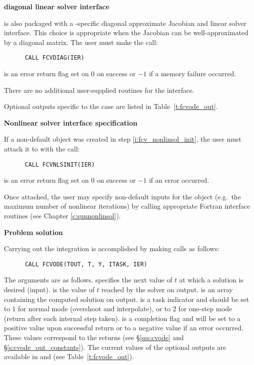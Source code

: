 \begin{Steps}
  {\bf {\cvdiag} diagonal linear solver interface}
  
  {\cvode} is also packaged with a {\cvode}-specific diagonal
  approximate Jacobian and linear solver interface.  This choice is
  appropriate when the Jacobian can be well-approximated by a diagonal
  matrix.  The user must make the call: 
\begin{verbatim}
      CALL FCVDIAG(IER)
\end{verbatim}
   is an error return flag set on $0$ on success or $-1$ if a memory 
  failure occurred.

  There are no additional user-supplied routines for the {\cvdiag} interface.
  
  Optional outputs specific to the {\cvdiag} case are listed in
  Table~\ref{t:fcvode_out}.
  
\item\label{i:fcvode_nonlin_solv_spec} {\bf Nonlinear solver interface specification} 
 
  If a non-default {\sunnonlinsol} object was created in step
  \ref{i:fcv_nonlinsol_init}, the user must attach it to {\cvode} with
  the call:
\begin{verbatim}
      CALL FCVNLSINIT(IER)
\end{verbatim}
   is an error return flag set on $0$ on success or $-1$ if an
  error occurred.

  Once attached, the user may specify non-default inputs for the
  {\sunnonlinsol} object (e.g.~the maximum number of nonlinear
  iterations) by calling appropriate Fortran interface routines (see Chapter
  \ref{c:sunnonlinsol}). 

\item {\bf Problem solution}

  Carrying out the integration is accomplished by making calls as follows:
\begin{verbatim}
      CALL FCVODE(TOUT, T, Y, ITASK, IER)
\end{verbatim}
  The arguments are as follows.
   specifies the next value of $t$ at which a solution is desired (input).
   is the value of $t$ reached by the solver on output.
   is an array containing the computed solution on output.
   is a task indicator and should be set to $1$ for normal mode 
  (overshoot  and interpolate), or to $2$ for one-step mode 
  (return after each internal step taken).
   is a completion flag and will be set to a positive value upon
  successful return or to a negative value if an error occurred. These values
  correspond to the  returns (see \S\ref{sss:cvode} and \S\ref{s:cvode_out_constants}).
  The current values of the optional outputs are available in  and
   (see Table~\ref{t:fcvode_out}).
  

\end{Steps}
